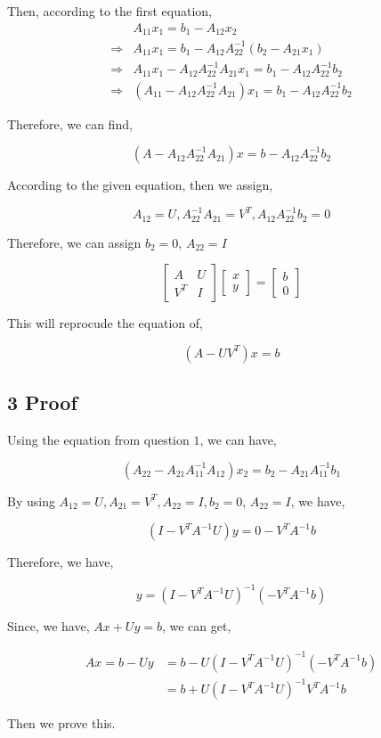 \documentclass{article}
\def\implies{\Longrightarrow}
\begin{document}
Then, according to the first equation,
\[
\begin{split}
 & A_{11}x_1 = b_1 - A_{12}x_2 \\
 \implies & A_{11}x_1  = b_1 - A_{12}A_{22}^{-1}(b_2 - A_{21}x_1) \\
 \implies & A_{11}x_1 - A_{12}A_{22}^{-1}A_{21}x_1 =b_1 - A_{12}A_{22}^{-1}b_2 \\
 \implies & (A_{11} - A_{12}A_{22}^{-1}A_{21})x_1 = b_1 -  A_{12}A_{22}^{-1}b_2 
\end{split}
\]


Therefore, we can find,

$$(A - A_{12}A_{22}^{-1}A_{21})x = b -  A_{12}A_{22}^{-1}b_2 $$

According to the given equation, then we assign,

$$A_{12} = U, A_{22}^{-1}A_{21} = V^T, A_{12}A_{22}^{-1}b_2 = 0$$

Therefore, we can assign $b_2 = 0$, $A_{22} = I$

$$\begin{bmatrix} A & U \\ V^T & I\end{bmatrix} \begin{bmatrix} x \\ y \end{bmatrix} = \begin{bmatrix} b \\ 0 \end{bmatrix}$$

This will reprocude the equation of,

$$(A - UV^T) x = b$$

\subsection*{3 Proof}

Using the equation from question $1$, we can have,


$$(A_{22} - A_{21}A_{11}^{-1}A_{12})x_2 = b_2 -  A_{21}A_{11}^{-1}b_1 $$

By using  $A_{12} = U, A_{21} = V^T, A_{22} = I, b_2 = 0$, $A_{22} = I$, we have,


$$(I -  V^TA^{-1}U)y = 0 -  V^TA^{-1}b $$

Therefore, we have,

$$y = (I -  V^TA^{-1}U)^{-1}(-  V^TA^{-1}b )$$

Since, we have, $Ax + Uy = b$, we can get,

\[
\begin{split}
Ax = b - Uy &= b - U(I -  V^TA^{-1}U)^{-1}(-  V^TA^{-1}b ) \\
            &= b + U(I -  V^TA^{-1}U)^{-1}V^TA^{-1}b 
\end{split}
\]

Then we prove this.
\end{document}
